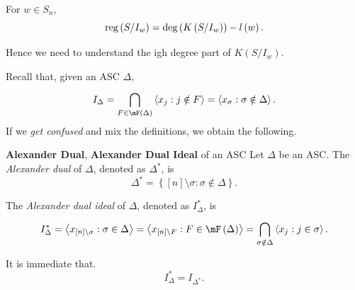 \documentclass[co439]{subfiles}
\begin{document}
    \placeqed[tl;dr]
    
    \begin{cor}{}
        For $w\in S_n$,
        \begin{equation*}
            \operatorname{reg}\left( S /I_w \right) = \deg\left( K\left( S /I_w \right) \right) - l\left( w \right).
        \end{equation*}
    \end{cor}	

    \rruleline

    \np Hence we need to understand the igh degree part of $K\left( S /I_w \right)$.
    
    \np Recall that, given an ASC $\Delta$,
    \begin{equation*}
        I_{\Delta} = \bigcap^{}_{F\in\mF\left( \Delta \right)} \left< x_j : j\notin F \right> = \left< x_{\sigma}:\sigma\notin\Delta \right>.  
    \end{equation*}
    If we \textit{get confused} and mix the definitions, we obtain the following.

    \begin{definition}{\textbf{Alexander Dual}, \textbf{Alexander Dual Ideal} of an ASC}
        Let $\Delta$ be an ASC. The \emph{Alexander dual} of $\Delta$, denoted as $\Delta^{*}$, is
        \begin{equation*}
            \Delta^{*} = \left\lbrace \left[ n \right]\setminus\sigma: \sigma\notin\Delta \right\rbrace.
        \end{equation*}

        The \emph{Alexander dual ideal} of $\Delta$, denoted as $I^{*}_{\Delta}$, is
        \begin{equation*}
            I_{\Delta}^{*} = \left< x_{\left[ n \right]\setminus\sigma} : \sigma\in\Delta \right> = \left< x_{\left[ n \right]\setminus F} : F\in\mF\left( \Delta \right) \right> = \bigcap^{}_{\sigma\notin\Delta} \left< x_j: j\in\sigma \right>.   
        \end{equation*}
    \end{definition}

    \np It is immediate that.
    \begin{equation*}
        I_{\Delta}^{*} = I_{\Delta^{*}}.
    \end{equation*}
    
\end{document}
